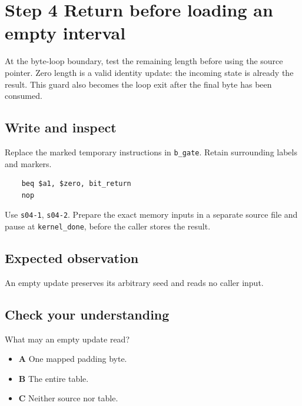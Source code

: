 \section{Step 4 Return before loading an empty interval}\label{crc-s04}

At the byte-loop boundary, test the remaining length before using the source pointer. Zero length is a valid identity update: the incoming state is already the result. This guard also becomes the loop exit after the final byte has been consumed.

\subsection{Write and inspect}
Replace the marked temporary instructions in \texttt{b\_gate}. Retain surrounding labels and markers.

\begin{verbatim}
    beq $a1, $zero, bit_return
    nop
\end{verbatim}

Use \texttt{s04-1}, \texttt{s04-2}. Prepare the exact memory inputs in a separate source file and pause at \texttt{kernel\_done}, before the caller stores the result.

\subsection{Expected observation}
An empty update preserves its arbitrary seed and reads no caller input.

\subsection{Check your understanding}
What may an empty update read?

\begin{itemize}
\item \textbf{A} One mapped padding byte.
\item \textbf{B} The entire table.
\item \textbf{C} Neither source nor table.
\end{itemize}
